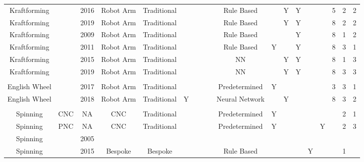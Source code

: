 \begin{tabular}{cccccccccccccccccc}
Kraftforming  & \citep{Opritescu2016VariationVariance}            & 2016 & Robot Arm & Traditional &   &   &   &   & Rule Based      &   & Y & Y &   &   & 5 & 2 & 2 \\
Kraftforming  & \citep{Hartmann2019Knowledge-basedPartitioning}            & 2019 & Robot Arm & Traditional &   &   &   &   & Rule Based      &   & Y & Y &   &   & 8 & 2 & 2 \\
Kraftforming  & \citep{Yang2009AutomatisierungProgramming}                 & 2009 & Robot Arm & Traditional &   &   &   &   & Rule Based      &   &   & Y &   &   & 8 & 1 & 2 \\
Kraftforming  & \citep{Yang2011GeometricalProcess}                 & 2011 & Robot Arm & Traditional &   &   &   &   & Rule Based      & Y &   & Y &   &   & 8 & 3 & 1 \\
Kraftforming  & \citep{Opritescu2015AutomatedApproach}            & 2015 & Robot Arm & Traditional &   &   &   &   & NN              &   & Y & Y &   &   & 8 & 1 & 3 \\
Kraftforming  & \citep{Hartmann2019AnFree-forming}             & 2019 & Robot Arm & Traditional &   &   &   &   & NN              &   & Y & Y &   &   & 8 & 3 & 3 \\
              &                          &      &           &             &   &   &   &   &                 &   &   &   &   &   &   &   &   \\
English Wheel & \citep{Vazquez2017RoboticWheeling}              & 2017 & Robot Arm & Traditional &   &   &   &   & Predetermined   & Y &   &   &   &   & 3 & 3 & 1 \\
English Wheel & \citep{Rossi2018ModellingWheel}                & 2018 & Robot Arm & Traditional & Y &   &   &   & Neural Network  &   & Y &   &   &   & 8 & 3 & 2 \\
              &                          &      &           &             &   &   &   &   &                 &   &   &   &   &   &   &   &   \\
Spinning      & CNC                      & NA   & CNC       & Traditional &   &   &   &   & Predetermined   & Y &   &   &   &   &   & 2 & 1 \\
Spinning      & PNC                      & NA   & CNC       & Traditional &   &   &   &   & Predetermined   & Y &   &   &   & Y &   & 2 & 3 \\
Spinning      & \citep{Henkenjohann2005AnProcess} & 2005 &           &             &   &   &   &   &                 &   &   &   &   &   &   &   &   \\
Spinning      & \citep{Polyblank2015ParametricSpinning}   & 2015 & Bespoke   & Bespoke     &   &   &   &   & Rule Based      &   &   &   & Y &   &   & 1 &   \\
\bottomrule
\end{tabular} 